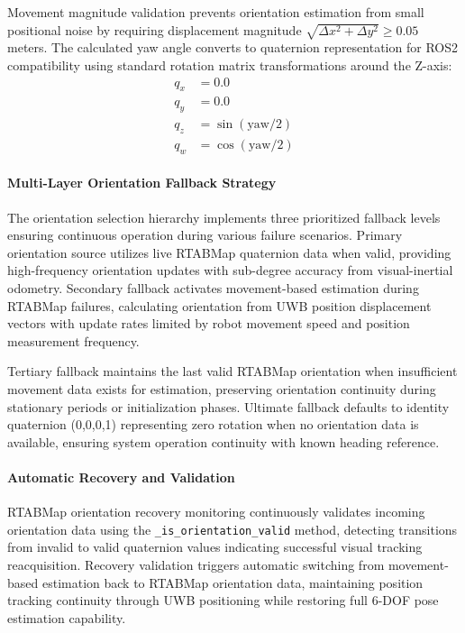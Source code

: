 Movement magnitude validation prevents orientation estimation from small positional noise by requiring displacement magnitude $\sqrt{\Delta x^2 + \Delta y^2} \geq 0.05$ meters. The calculated yaw angle converts to quaternion representation for ROS2 compatibility using standard rotation matrix transformations around the Z-axis:
\begin{align}
q_x &= 0.0 \\
q_y &= 0.0 \\
q_z &= \sin(\text{yaw}/2) \\
q_w &= \cos(\text{yaw}/2)
\end{align}

\paragraph{Multi-Layer Orientation Fallback Strategy}

The orientation selection hierarchy implements three prioritized fallback levels ensuring continuous operation during various failure scenarios. Primary orientation source utilizes live RTABMap quaternion data when valid, providing high-frequency orientation updates with sub-degree accuracy from visual-inertial odometry. Secondary fallback activates movement-based estimation during RTABMap failures, calculating orientation from UWB position displacement vectors with update rates limited by robot movement speed and position measurement frequency.

Tertiary fallback maintains the last valid RTABMap orientation when insufficient movement data exists for estimation, preserving orientation continuity during stationary periods or initialization phases. Ultimate fallback defaults to identity quaternion (0,0,0,1) representing zero rotation when no orientation data is available, ensuring system operation continuity with known heading reference.

\paragraph{Automatic Recovery and Validation}

RTABMap orientation recovery monitoring continuously validates incoming orientation data using the \texttt{\_is\_orientation\_valid} method, detecting transitions from invalid to valid quaternion values indicating successful visual tracking reacquisition. Recovery validation triggers automatic switching from movement-based estimation back to RTABMap orientation data, maintaining position tracking continuity through UWB positioning while restoring full 6-DOF pose estimation capability.

